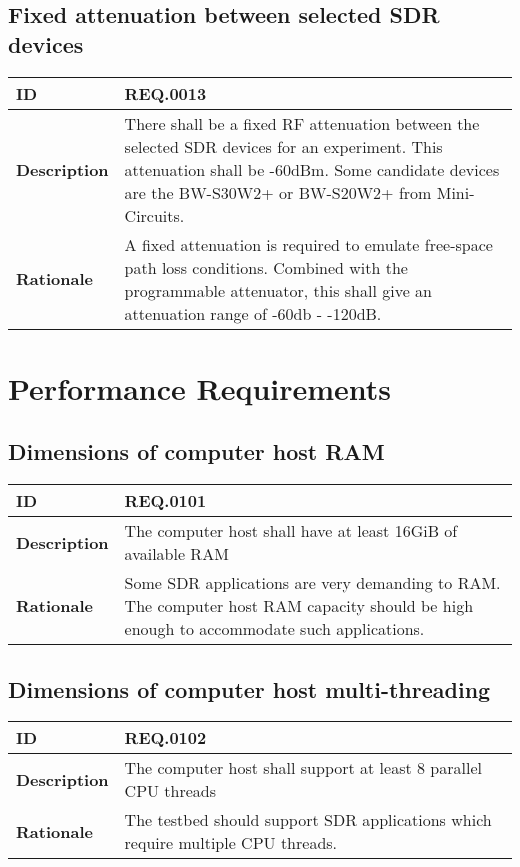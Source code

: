 \documentclass[english,titlepage,a4paper]{report}
\begin{document}
\subsection{Fixed attenuation between selected SDR devices}
\begin{tabular}{|l|p{9cm}|}
  \hline
  \textbf{ID} & REQ.0013 \\
  \hline
  \textbf{Description} &
  There shall be a fixed RF attenuation between the selected SDR devices for an experiment.
  This attenuation shall be -60dBm.
  Some candidate devices are the BW-S30W2+ or BW-S20W2+ from Mini-Circuits.
  \\
  \hline
  \textbf{Rationale} &
  A fixed attenuation is required to emulate free-space path loss conditions.
  Combined with the programmable attenuator, this shall give an attenuation range of -60db - -120dB.
  \\
  \hline
\end{tabular}

\section{Performance Requirements}

\subsection{Dimensions of computer host RAM}
\begin{tabular}{|l|p{9cm}|}
  \hline
  \textbf{ID} & REQ.0101 \\
  \hline
  \textbf{Description} &
  The computer host shall have at least 16GiB of available RAM
  \\
  \hline
  \textbf{Rationale} &
  Some SDR applications are very demanding to RAM.
  The computer host RAM capacity should be high enough to accommodate such applications.
  \\
  \hline
\end{tabular}

\subsection{Dimensions of computer host multi-threading}
\begin{tabular}{|l|p{9cm}|}
  \hline
  \textbf{ID} & REQ.0102 \\
  \hline
  \textbf{Description} &
  The computer host shall support at least 8 parallel CPU threads
  \\
  \hline
  \textbf{Rationale} &
  The testbed should support SDR applications which require multiple CPU threads.
  \\
  \hline
\end{tabular}
\end{document}
